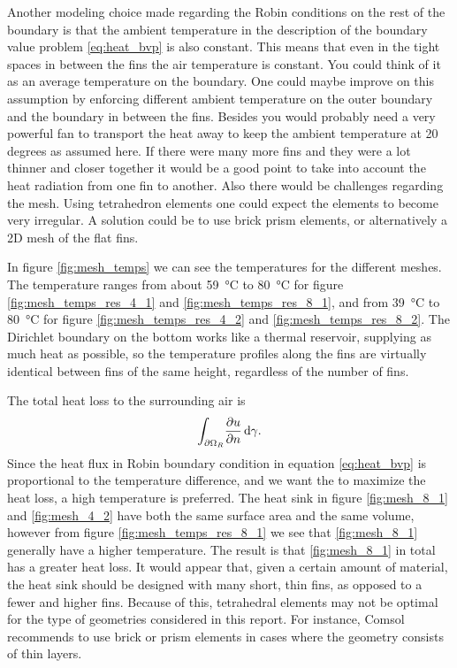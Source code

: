 Another modeling choice made regarding the Robin conditions on the rest of the boundary is that the ambient temperature in the description of the boundary value problem \eqref{eq:heat_bvp} is also constant. This means that even in the tight spaces in between the fins the air temperature is constant. You could think of it as an average temperature on the boundary. One could maybe improve on this assumption by enforcing different ambient temperature on the outer boundary and the boundary in between the fins. Besides you would probably need a very powerful fan to transport the heat away to keep the ambient temperature at 20 degrees as assumed here.
If there were many more fins and they were a lot thinner and closer together it would be a good point to take into account the heat radiation from one fin to another. Also there would be challenges regarding the mesh. Using tetrahedron elements one could expect the elements to become very irregular. A solution could be to use brick prism elements, or alternatively a 2D mesh of the flat fins.

In figure \ref{fig:mesh_temps} we can see the temperatures for the different meshes. The temperature ranges from about \SI{59}{\celsius} to \SI{80}{\celsius} for figure \ref{fig:mesh_temps_res_4_1} and \ref{fig:mesh_temps_res_8_1}, and from \SI{39}{\celsius} to \SI{80}{\celsius} for figure \ref{fig:mesh_temps_res_4_2} and \ref{fig:mesh_temps_res_8_2}. The Dirichlet boundary on the bottom works like a thermal reservoir, supplying as much heat as possible, so the temperature profiles along the fins are virtually identical between fins of the same height, regardless of the number of fins.

The total heat loss to the surrounding air is
\begin{equation}
    \int_{\partial\Omega_R}\! \pdv{u}{n}\, \mathrm{d}{\gamma}.
\end{equation}
Since the heat flux in Robin boundary condition in equation \eqref{eq:heat_bvp} is proportional to the temperature difference, and we want the to maximize the heat loss, a high temperature is preferred. The heat sink in figure \ref{fig:mesh_8_1} and \ref{fig:mesh_4_2} have both the same surface area and the same volume,  however from figure \ref{fig:mesh_temps_res_8_1} we see that \ref{fig:mesh_8_1} generally have a higher temperature. The result is that \ref{fig:mesh_8_1} in total has a greater heat loss. It would appear that, given a certain amount of material, the heat sink should be designed with many short, thin fins, as opposed to a fewer and higher fins. Because of this, tetrahedral elements may not be optimal for the type of geometries considered in this report. For instance, Comsol \cite{comsol_mesh_types} recommends to use brick or prism elements in cases where the geometry consists of thin layers.
